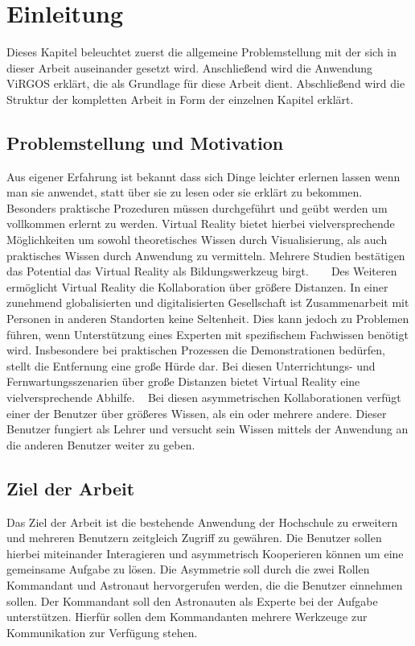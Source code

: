 \section{Einleitung}
Dieses Kapitel beleuchtet zuerst die allgemeine Problemstellung mit der sich in dieser Arbeit auseinander gesetzt wird. Anschließend wird die Anwendung ViRGOS erklärt, die als Grundlage für diese Arbeit dient. Abschließend wird die Struktur der kompletten Arbeit in Form der einzelnen Kapitel erklärt.

\subsection{Problemstellung und Motivation} \label{Problemstellung}
Aus eigener Erfahrung ist bekannt dass sich Dinge leichter erlernen lassen wenn man sie anwendet, statt über sie zu lesen oder sie erklärt zu bekommen. Besonders praktische Prozeduren müssen durchgeführt und geübt werden um vollkommen erlernt zu werden. Virtual Reality bietet hierbei vielversprechende Möglichkeiten um sowohl theoretisches Wissen durch Visualisierung, als auch praktisches Wissen durch Anwendung zu vermitteln. Mehrere Studien bestätigen das Potential das Virtual Reality als Bildungswerkzeug birgt. ~\parencite{8864531} ~\parencite{8797755} Des Weiteren ermöglicht Virtual Reality die Kollaboration über größere Distanzen. In einer zunehmend globalisierten  und digitalisierten Gesellschaft ist Zusammenarbeit mit Personen in anderen Standorten keine Seltenheit. Dies kann jedoch zu Problemen führen, wenn Unterstützung eines Experten mit spezifischem Fachwissen benötigt wird. Insbesondere bei praktischen Prozessen die Demonstrationen bedürfen, stellt die Entfernung eine große Hürde dar. Bei diesen Unterrichtungs- und Fernwartungsszenarien über große Distanzen bietet Virtual Reality eine vielversprechende Abhilfe. ~\parencite{10.1145/2807442.2807497} Bei diesen asymmetrischen Kollaborationen verfügt einer der Benutzer über größeres Wissen, als ein oder mehrere andere. Dieser Benutzer fungiert als Lehrer und versucht sein Wissen mittels der Anwendung an die anderen Benutzer weiter zu geben. \\
 

\subsection{Ziel der Arbeit}

Das Ziel der Arbeit ist die bestehende Anwendung der Hochschule zu erweitern und mehreren Benutzern zeitgleich Zugriff zu gewähren. Die Benutzer sollen hierbei miteinander Interagieren und asymmetrisch Kooperieren können um eine gemeinsame Aufgabe zu lösen. Die Asymmetrie soll durch die zwei Rollen Kommandant und Astronaut hervorgerufen werden, die die Benutzer einnehmen sollen. Der Kommandant soll den Astronauten als Experte bei der Aufgabe unterstützen. Hierfür sollen dem Kommandanten mehrere Werkzeuge zur Kommunikation zur Verfügung stehen. \\

